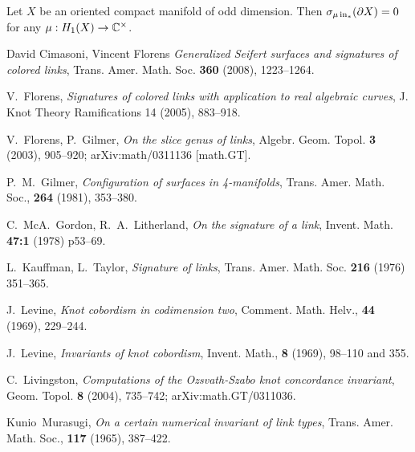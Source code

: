 \documentclass{article}
\numberwithin{equation}{section}
\begin{document}
\begin{ATh}\label{VanSign}
Let $X$ be an oriented compact manifold of odd dimension. Then 
$\sigma_{\mu\operatorname{in}_*}(\partial X)=0$
for any
$\mu:H_1(X)\to\mathbb C^\times$.
\end{ATh}










\begin{thebibliography}{99}

 David Cimasoni, Vincent Florens {\sl Generalized 
Seifert surfaces and signatures of colored links}, Trans. Amer. Math. Soc.
{\bf 360}  (2008), 1223--1264. 

 V.~Florens, {\sl Signatures of colored links
with application to real algebraic curves},
  J. Knot Theory Ramifications  14 (2005), 883--918.

 V.~Florens, P.~Gilmer, {\sl On the slice genus of links},
Algebr. Geom. Topol. {\bf 3} (2003), 905--920; arXiv:math/0311136 [math.GT].

  P.~M.~Gilmer, {\sl Configuration of surfaces 
in 4-manifolds}, Trans. Amer. Math. Soc., {\bf 264} (1981), 353--380.

 C.~McA.~Gordon, R.~A.~Litherland, {\sl On the 
signature of a link}, Invent. Math. {\bf 47:1}
(1978) p53--69.


 L.~Kauffman, L.~Taylor, {\sl Signature of links}, 
Trans. Amer. Math. Soc. {\bf 216} (1976) 351--365.


 J.~Levine, {\sl Knot cobordism in codimension two},
Comment. Math. Helv., {\bf 44} (1969), 229--244.

 J.~Levine,  {\sl Invariants of knot cobordism}, 
Invent. Math., {\bf 8} (1969), 98--110 and 355.

 C.~Livingston, {\sl Computations of the Ozsvath-Szabo 
knot concordance invariant}, Geom. Topol. {\bf 8} (2004), 735--742; 
arXiv:math.GT/0311036.

  Kunio~Murasugi, {\sl On a certain numerical invariant 
  of link types}, Trans. Amer. Math. Soc., {\bf 117} (1965), 387--422.   


\end{thebibliography}
\end{document}
